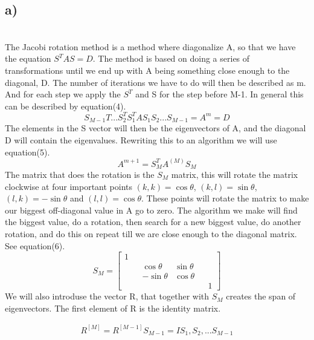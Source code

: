 \documentclass[english,notitlepage]{revtex4-1}  %
\begin{document}
\subsection*{a)}\
\\
The Jacobi rotation method is a method where diagonalize A, so that we have the equation $S^T A S = D$. The method is based on doing a series of transformations until we end up with A being something close enough to the diagonal, D. The number of iterations we have to do will then be described as m. And for each step we apply the $S^T$ and S for the step before M-1. In general this can be described by equation(4).
\begin{equation}
S_{M-1}{T} ... S_2^T S_1^T A S_1S_2 ... S_{M-1} = A^{m} = D
\end{equation}
The elements in the S vector will then be the eigenvectors of A, and the diagonal D will contain the eigenvalues. Rewriting this to an algorithm we will use equation(5).
\begin{equation}
A^{m + 1} = S_M^T A^{(M)} S_M
\end{equation}
The matrix that does the rotation is the $S_M$ matrix, this will rotate the matrix clockwise at four important points $(k, k) = \cos \theta$, $(k, l) = \sin \theta$, $(l, k) = -\sin \theta$ and $(l, l) = \cos \theta$. These points will rotate the matrix to make our biggest off-diagonal value in A go to zero. The algorithm we make will find the biggest value, do a rotation, then search for a new biggest value, do another rotation, and do this on repeat till we are close enough to the diagonal matrix. See equation(6). 
\begin{equation}
S_M = \begin{bmatrix} 
1 & & & & \\
 & & \cos \theta & \sin \theta & \\
 & & -\sin \theta & \cos \theta & \\
 & & & & & 1
 \end{bmatrix}
\end{equation} 
We will also introduse the vector R, that together with $S_M$ creates the span of eigenvectors. The first element of R is the identity matrix. 

\begin{align}
R^{[M]} = R^{[M - 1]} S_{M - 1}= I S_1, S_2, ... S_{M - 1}
\end{align}
\end{document}
